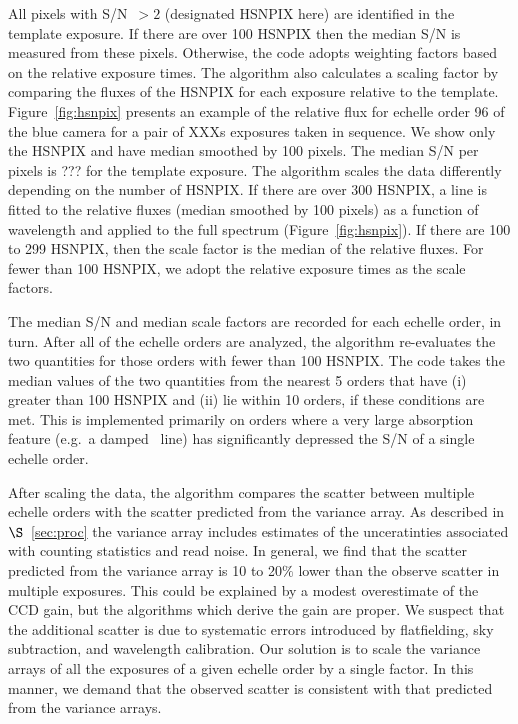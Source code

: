\documentclass[12pt,preprint]{aastex}
\begin{document}
All pixels with S/N~$>2$ (designated HSNPIX here) are identified
in the template exposure.  If there are over 100 HSNPIX then
the median S/N is measured from these pixels.  Otherwise, the
code adopts weighting factors based on the relative exposure times.
The algorithm also calculates a scaling factor by comparing the
fluxes of the HSNPIX for each exposure relative to the template.
Figure~\ref{fig:hsnpix} presents an example of the relative flux
for echelle order 96 of the blue camera for a pair of XXXs exposures
taken in sequence.  We show only the HSNPIX and have median smoothed
by 100 pixels.  The median S/N per pixels is ??? for the template
exposure.   The algorithm scales the data differently depending
on the number of HSNPIX.
If there are over 300 HSNPIX, a line is fitted to the relative
fluxes (median smoothed by 100 pixels)
as a function of wavelength and applied to the full spectrum  
(Figure~\ref{fig:hsnpix}).
If there are 100 to 299 HSNPIX, then the scale factor is the median of 
the relative fluxes.  For fewer than 100 HSNPIX, we adopt the relative
exposure times as the scale factors.

The median S/N and median scale factors are recorded for each
echelle order, in turn.  After all of the echelle orders are
analyzed, the algorithm re-evaluates the two quantities for those
orders with fewer than 100 HSNPIX.  The code takes the median values
of the two quantities from the nearest 5 orders that have (i)
greater than 100 HSNPIX and (ii) lie within 10 orders, if these
conditions are met.  This is implemented primarily on
orders where a very large absorption feature (e.g.\ a damped \lya\ line)
has significantly depressed the S/N of a single echelle order.

After scaling the data, the algorithm compares the scatter
between multiple echelle orders with the scatter predicted from
the variance array.  As described in $\S$~\ref{sec:proc}
the variance array includes
estimates of the unceratinties associated with counting statistics and read noise.
In general, we find that the scatter predicted from the variance array is 
10 to 20$\%$ lower than the observe scatter in multiple exposures.
This could be explained by a modest overestimate of the CCD gain,
but the algorithms which derive the gain are proper.
We suspect that the additional scatter
is due to systematic errors introduced by flatfielding, 
sky subtraction, and wavelength calibration.  Our solution is to
scale the variance arrays of all the exposures of a given echelle order
by a single factor.  In this manner,  we demand that the 
observed scatter is consistent
with that predicted from the variance arrays.
\end{document}
